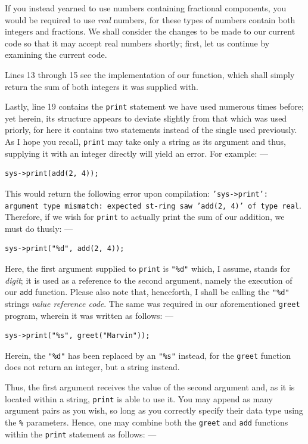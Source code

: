 \documentclass[a5paper,twoside,12pt]{report}
\begin{document}
If you instead yearned to use numbers containing fractional components, you would be required to use \textit{real} numbers, for these types of numbers contain both integers and fractions. We shall consider the changes to be made to our current code so that it may accept real numbers shortly; first, let us continue by examining the current code.

Lines 13 through 15 see the implementation of our function, which shall simply return the sum of both integers it was supplied with.

Lastly, line 19 contains the \texttt{print} statement we have used numerous times before; yet herein, its structure appears to deviate slightly from that which was used priorly, for here it contains two statements instead of the single used previously. As I hope you recall, \texttt{print} may take only a string as its argument and thus, supplying it with an integer directly will yield an error. For example: —

\begin{lstlisting}
sys->print(add(2, 4));
\end{lstlisting}

This would return the following error upon compilation: \texttt{'sys->print': argument type mismatch: expected st-\allowbreak ring saw 'add(2, 4)' of type real}. Therefore, if we wish for \texttt{print} to actually print the sum of our addition, we must do thusly: —

\begin{lstlisting}
sys->print("%d", add(2, 4));
\end{lstlisting}

Here, the first argument supplied to \texttt{print} is \texttt{"\%d"} which, I assume, stands for \textit{digit}; it is used as a reference to the second argument, namely the execution of our \texttt{add} function. Please also note that, henceforth, I shall be calling the \texttt{"\%d"} strings \textit{value reference code}. The same was required in our aforementioned \texttt{greet} program, wherein it was written as follows: —

\begin{lstlisting}
sys->print("%s", greet("Marvin"));
\end{lstlisting}

Herein, the \texttt{"\%d"} has been replaced by an \texttt{"\%s"} instead, for the \texttt{greet} function does not return an integer, but a string instead. 

Thus, the first argument receives the value of the second argument and, as it is located within a string, \texttt{print} is able to use it. You may append as many argument pairs as you wish, so long as you correctly specify their data type using the \texttt{\%} parameters. Hence, one may combine both the \texttt{greet} and \texttt{add} functions within the \texttt{print} statement as follows: —
\end{document}

